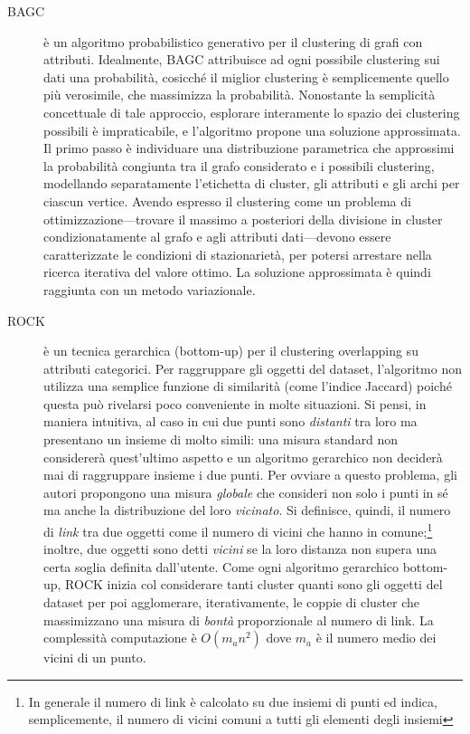 \begin{description}
\item[BAGC] \`e un algoritmo probabilistico generativo per il clustering di grafi con attributi. Idealmente, BAGC attribuisce ad ogni possibile clustering sui dati una probabilit\`a, cosicch\'e il miglior clustering \`e semplicemente quello pi\`u verosimile, che massimizza la probabilit\`a. Nonostante la semplicit\`a concettuale di tale approccio, esplorare interamente lo spazio dei clustering possibili \`e impraticabile, e l'algoritmo propone una soluzione approssimata. Il primo passo \`e individuare una distribuzione parametrica che approssimi la probabilit\`a congiunta tra il grafo considerato e i possibili clustering, modellando separatamente l'etichetta di cluster, gli attributi e gli archi per ciascun vertice. Avendo espresso il clustering come un problema di ottimizzazione---trovare il massimo a posteriori della divisione in cluster condizionatamente al grafo e agli attributi dati---devono essere caratterizzate le condizioni di stazionariet\`a, per potersi arrestare nella ricerca iterativa del valore ottimo. La soluzione approssimata \`e quindi raggiunta con un metodo variazionale.

\item[ROCK] \`e un tecnica gerarchica (bottom-up) per il clustering overlapping su attributi categorici. Per raggruppare gli oggetti del dataset, l'algoritmo non utilizza una semplice funzione di similarit\`a (come l'indice Jaccard) poich\'e questa pu\`o rivelarsi poco conveniente in molte situazioni. Si pensi, in maniera intuitiva, al caso in cui due punti sono \textit{distanti} tra loro ma presentano un insieme di  molto simili: una misura standard non considerer\`a quest'ultimo aspetto e un algoritmo gerarchico non decider\`a mai di raggruppare insieme i due punti. Per ovviare a questo problema, gli autori propongono una misura \textit{globale} che consideri non solo i punti in s\'e ma anche la distribuzione del loro \textit{vicinato}. Si definisce, quindi, il numero di \textit{link} tra due oggetti come il numero di vicini che hanno in comune;\footnote{In generale il numero di link \`e calcolato su due insiemi di punti ed indica, semplicemente, il numero di vicini comuni a tutti gli elementi degli insiemi} inoltre, due oggetti sono detti \textit{vicini} se la loro distanza non supera una certa soglia definita dall'utente. Come ogni algoritmo gerarchico bottom-up, ROCK inizia col considerare tanti cluster quanti sono gli oggetti del dataset per poi agglomerare, iterativamente, le coppie di cluster che massimizzano una misura di \textit{bont\`a} proporzionale al numero di link. La complessit\`a computazione \`e $ O(m_{a}n^{2}) $ dove $ m_{a} $ \`e il numero medio dei vicini di un punto.

\end{description}
